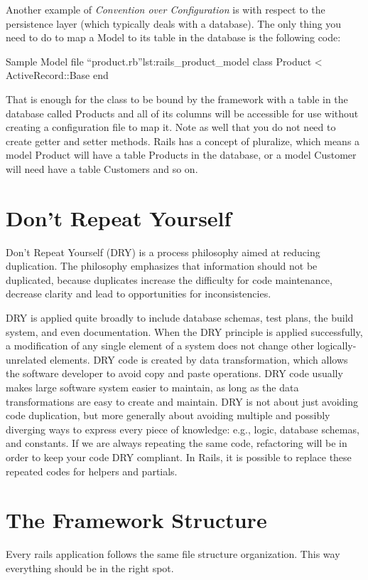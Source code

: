Another example of \emph{Convention over Configuration} is with respect to the persistence layer 
(which typically deals with a database). 
The only thing you need to do to map a Model to its table in the database is the following code:
\begin{rubycode}{Sample Model file “product.rb”}{lst:rails_product_model}
class Product < ActiveRecord::Base 
end
\end{rubycode}

That is enough for the class to be bound by the framework with a table in the database called Products and all of its columns will be accessible for use without creating a configuration file to map it. Note as well that you do not need to create getter and setter methods.
Rails has a concept of pluralize, which means a model Product will have a table Products in the database, or a model Customer will need have a table Customers and so on.



\section{Don’t Repeat Yourself} 
Don’t Repeat Yourself (DRY) is a process philosophy aimed at reducing duplication. 
The philosophy emphasizes that information should not be duplicated, 
because duplicates increase the difficulty for code maintenance, 
decrease clarity and lead to opportunities for inconsistencies.

DRY is applied quite broadly to include database schemas, 
test plans, the build system, and even documentation. 
When the DRY principle is applied successfully, 
a modification of any single element of a system does not change other logically-unrelated elements.
DRY code is created by data transformation, which allows the software developer to avoid copy and paste operations.
DRY code usually makes large software system easier to maintain, 
as long as the data transformations are easy to create and maintain.
DRY is not about just avoiding code duplication, 
but more generally about avoiding multiple and possibly diverging ways to express every piece of knowledge: 
e.g., logic, database schemas, and constants.
If we are always repeating the same code, 
refactoring will be in order to keep your code DRY compliant. 
In Rails, it is possible to replace these repeated codes for helpers and partials.



\section{The Framework Structure} 
Every rails application follows the same file structure organization. 
This way everything should be in the right spot.

